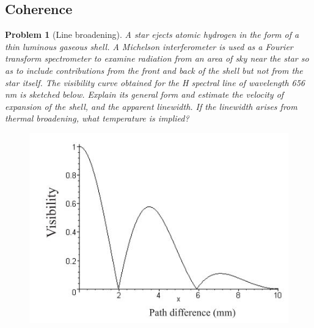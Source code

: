 \documentclass[a4paper]{article}
\theoremstyle{new}
\newtheorem{qns}{Problem}[section]
\begin{document}
\subsection*{Coherence}
\begin{qns}[Line broadening]
A star ejects atomic hydrogen in the form of a thin luminous gaseous shell. A Michelson interferometer is used as a Fourier transform spectrometer to examine radiation from an area of sky near the star so as to include contributions from the front and back of the shell but not from the star itself. The visibility curve obtained for the H spectral line of wavelength 656 nm is sketched below. Explain its general form and estimate the velocity of expansion of the shell, and the apparent linewidth. If the linewidth arises from thermal broadening, what temperature is implied?
\begin{figure}[H]
    \centering
    \includegraphics[scale=0.6]{EOQ14.JPG}
\end{figure}
\end{qns}
\end{document}
